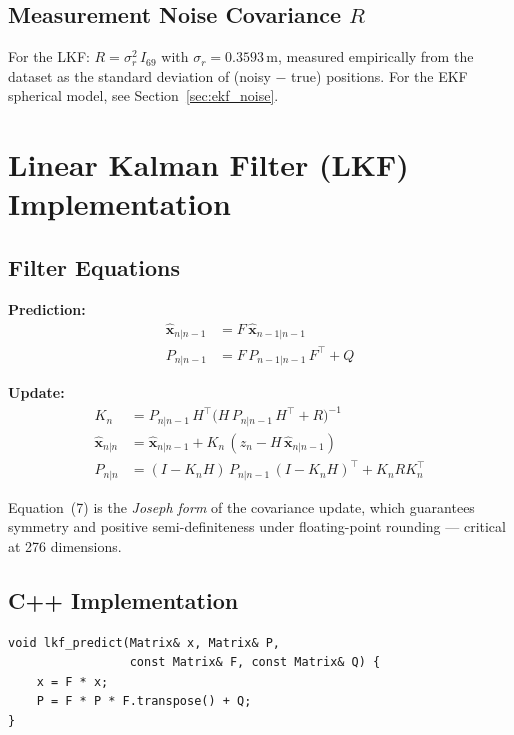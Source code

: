 \documentclass[11pt, a4paper]{article}
\begin{document}
\subsection{Measurement Noise Covariance \texorpdfstring{$R$}{R}}

For the LKF: $R = \sigma_r^2\,I_{69}$ with $\sigma_r = 0.3593\,\text{m}$, measured
empirically from the dataset as the standard deviation of (noisy $-$ true) positions.
For the EKF spherical model, see Section~\ref{sec:ekf_noise}.

\section{Linear Kalman Filter (LKF) Implementation}

\subsection{Filter Equations}

\textbf{Prediction:}
\begin{align}
  \hat{\mathbf{x}}_{n|n-1} &= F\,\hat{\mathbf{x}}_{n-1|n-1} \\
  P_{n|n-1}                &= F\,P_{n-1|n-1}\,F^\top + Q
\end{align}

\textbf{Update:}
\begin{align}
  K_n &= P_{n|n-1}\,H^\top
        \bigl(H\,P_{n|n-1}\,H^\top + R\bigr)^{-1} \\
  \hat{\mathbf{x}}_{n|n} &=
        \hat{\mathbf{x}}_{n|n-1} + K_n\,(z_n - H\,\hat{\mathbf{x}}_{n|n-1}) \\
  P_{n|n} &= (I - K_nH)\,P_{n|n-1}\,(I - K_nH)^\top + K_n R K_n^\top
\end{align}

Equation~(7) is the \emph{Joseph form} of the covariance update, which guarantees
symmetry and positive semi-definiteness under floating-point rounding --- critical
at 276 dimensions.

\subsection{C++ Implementation}

\begin{lstlisting}[caption={LKF predict step in \texttt{lkf.cpp}}]
void lkf_predict(Matrix& x, Matrix& P,
                 const Matrix& F, const Matrix& Q) {
    x = F * x;
    P = F * P * F.transpose() + Q;
}
\end{lstlisting}
\end{document}
